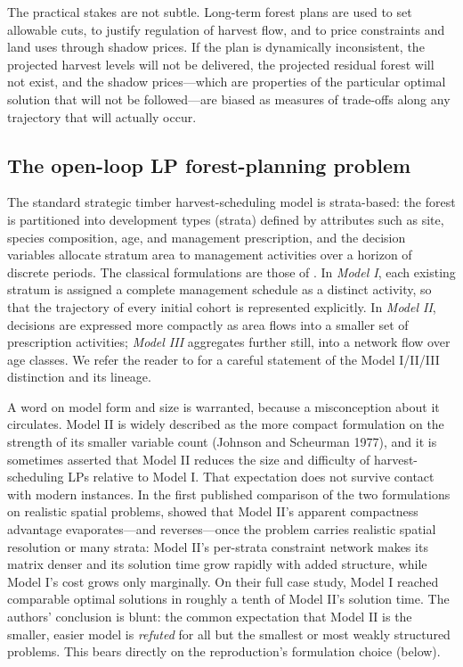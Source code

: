 \documentclass[12pt]{article}
\begin{document}
The practical stakes are not subtle. Long-term forest plans are used to set allowable cuts, to justify regulation of harvest flow, and to price constraints and land uses through shadow prices. If the plan is dynamically inconsistent, the projected harvest levels will not be delivered, the projected residual forest will not exist, and the shadow prices---which are properties of the particular optimal solution that will not be followed---are biased as measures of trade-offs along any trajectory that will actually occur.

\hypertarget{the-open-loop-lp-forest-planning-problem}{%
\subsection{The open-loop LP forest-planning problem}\label{the-open-loop-lp-forest-planning-problem}}

The standard strategic timber harvest-scheduling model is strata-based: the forest is partitioned into development types (strata) defined by attributes such as site, species composition, age, and management prescription, and the decision variables allocate stratum area to management activities over a horizon of discrete periods. The classical formulations are those of \citet{johnson1977techniques}. In \emph{Model I}, each existing stratum is assigned a complete management schedule as a distinct activity, so that the trajectory of every initial cohort is represented explicitly. In \emph{Model II}, decisions are expressed more compactly as area flows into a smaller set of prescription activities; \emph{Model III} aggregates further still, into a network flow over age classes. We refer the reader to \citep[ch.~16]{gunn2007models} for a careful statement of the Model I/II/III distinction and its lineage.

A word on model form and size is warranted, because a misconception about it circulates. Model II is widely described as the more compact formulation on the strength of its smaller variable count (Johnson and Scheurman 1977), and it is sometimes asserted that Model II reduces the size and difficulty of harvest-scheduling LPs relative to Model I. That expectation does not survive contact with modern instances. In the first published comparison of the two formulations on realistic spatial problems, \citet{martin2017comparing} showed that Model II's apparent compactness advantage evaporates---and reverses---once the problem carries realistic spatial resolution or many strata: Model II's per-strata constraint network makes its matrix denser and its solution time grow rapidly with added structure, while Model I's cost grows only marginally. On their full case study, Model I reached comparable optimal solutions in roughly a tenth of Model II's solution time. The authors' conclusion is blunt: the common expectation that Model II is the smaller, easier model is \emph{refuted} for all but the smallest or most weakly structured problems. This bears directly on the reproduction's formulation choice (below).
\end{document}
